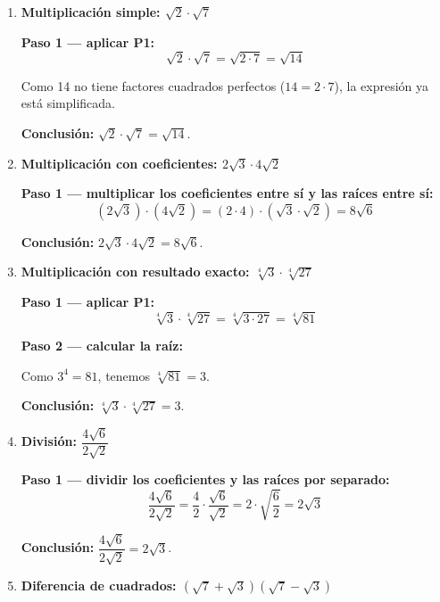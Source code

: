 \documentclass[11pt, letterpaper]{article}
\begin{document}
\begin{tcolorbox}[examplebox, title={Ejemplos}]
\begin{enumerate}[label=\textbf{Ej. \arabic*.}, leftmargin=*, itemsep=18pt]

\item \textbf{Multiplicación simple: $\sqrt{2} \cdot \sqrt{7}$}

\textbf{Paso 1 — aplicar P1:}
$$\sqrt{2} \cdot \sqrt{7} = \sqrt{2 \cdot 7} = \sqrt{14}$$

Como 14 no tiene factores cuadrados perfectos ($14 = 2 \cdot 7$), la expresión ya está simplificada.

\textbf{Conclusión:} $\sqrt{2} \cdot \sqrt{7} = \sqrt{14}$.

\item \textbf{Multiplicación con coeficientes: $2\sqrt{3} \cdot 4\sqrt{2}$}

\textbf{Paso 1 — multiplicar los coeficientes entre sí y las raíces entre sí:}
$$(2\sqrt{3})\cdot(4\sqrt{2}) = (2 \cdot 4)\cdot(\sqrt{3}\cdot\sqrt{2}) = 8\sqrt{6}$$

\textbf{Conclusión:} $2\sqrt{3} \cdot 4\sqrt{2} = 8\sqrt{6}$.

\item \textbf{Multiplicación con resultado exacto: $\sqrt[4]{3} \cdot \sqrt[4]{27}$}

\textbf{Paso 1 — aplicar P1:}
$$\sqrt[4]{3} \cdot \sqrt[4]{27} = \sqrt[4]{3 \cdot 27} = \sqrt[4]{81}$$

\textbf{Paso 2 — calcular la raíz:}

Como $3^4 = 81$, tenemos $\sqrt[4]{81} = 3$.

\textbf{Conclusión:} $\sqrt[4]{3} \cdot \sqrt[4]{27} = 3$.

\item \textbf{División: $\dfrac{4\sqrt{6}}{2\sqrt{2}}$}

\textbf{Paso 1 — dividir los coeficientes y las raíces por separado:}
$$\frac{4\sqrt{6}}{2\sqrt{2}} = \frac{4}{2} \cdot \frac{\sqrt{6}}{\sqrt{2}} = 2 \cdot \sqrt{\frac{6}{2}} = 2\sqrt{3}$$

\textbf{Conclusión:} $\dfrac{4\sqrt{6}}{2\sqrt{2}} = 2\sqrt{3}$.

\item \textbf{Diferencia de cuadrados: $(\sqrt{7}+\sqrt{3})(\sqrt{7}-\sqrt{3})$}


\end{enumerate}
\end{tcolorbox}
\end{document}
